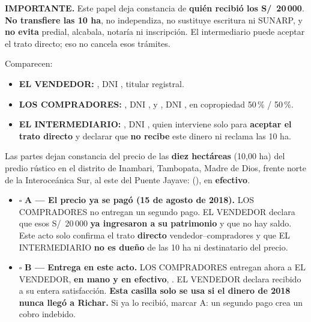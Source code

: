 \documentclass[12pt,a4paper]{article}
\begin{document}


\noindent \textbf{IMPORTANTE.} Este papel deja constancia de \textbf{quién recibió los S/\ 20\,000}. \textbf{No transfiere las 10 ha}, no independiza, no sustituye escritura ni SUNARP, y \textbf{no evita} predial, alcabala, notaría ni inscripción. El intermediario puede aceptar el trato directo; eso no cancela esos trámites.

\vspace{0.25em}
\noindent Comparecen:

\begin{itemize}[leftmargin=1.1cm,itemsep=0.12em]
\item \textbf{EL VENDEDOR:} \VendedorNombreCompleto, DNI \VendedorDNI, titular registral.
\item \textbf{LOS COMPRADORES:} \CompradorUnoNombre, DNI \CompradorUnoDNI, y \CompradorDosNombre, DNI \CompradorDosDNI, en copropiedad 50\,\% / 50\,\%.
\item \textbf{EL INTERMEDIARIO:} \IntermediarioNombre, DNI \IntermediarioDNI, quien interviene solo para \textbf{aceptar el trato directo} y declarar que \textbf{no recibe} este dinero ni reclama las 10 ha.
\end{itemize}

Las partes dejan constancia del precio de las \textbf{diez hectáreas} (10,00 ha) del predio rústico en el distrito de Inambari, Tambopata, Madre de Dios, frente norte de la Interoceánica Sur, al este del Puente Jayave: \textbf{\MontoPago} (\MontoPagoLetras), en \textbf{efectivo}.

{\small
\begin{itemize}[leftmargin=0.9cm]
\item $\square$ \textbf{A --- El precio ya se pagó (15 de agosto de 2018).} LOS COMPRADORES no entregan un segundo pago. EL VENDEDOR declara que esos S/\ 20\,000 \textbf{ya ingresaron a su patrimonio} y que no hay saldo. Este acto solo confirma el trato \textbf{directo} vendedor--compradores y que EL INTERMEDIARIO \textbf{no es dueño} de las 10 ha ni destinatario del precio.
\item $\square$ \textbf{B --- Entrega en este acto.} LOS COMPRADORES entregan ahora a EL VENDEDOR, \textbf{en mano y en efectivo}, \MontoPago. EL VENDEDOR declara recibido a su entera satisfacción. \textbf{Esta casilla solo se usa si el dinero de 2018 nunca llegó a Richar.} Si ya lo recibió, marcar A: un segundo pago crea un cobro indebido.
\end{itemize}}
\end{document}
